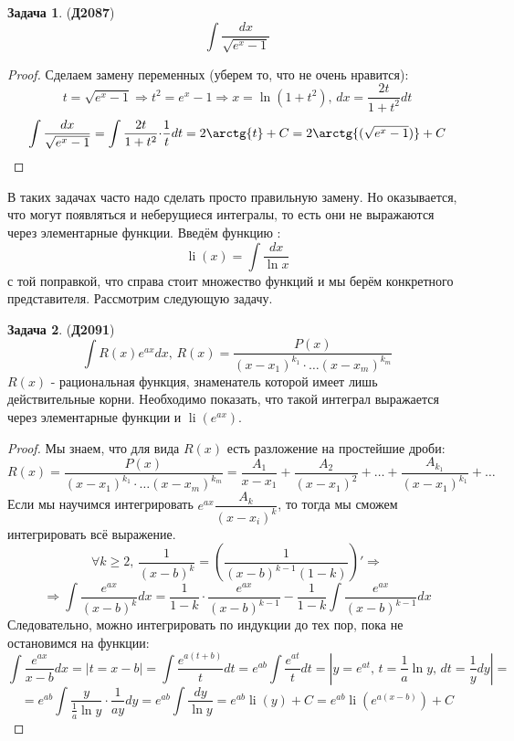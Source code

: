 \documentclass[12pt]{article}
\theoremstyle{definition}
\newtheorem{problem}{Задача}
\DeclareMathOperator{\dint}{\displaystyle\int}
\DeclareMathOperator{\li}{\operatorname{li}}
\begin{document}
\begin{problem}(\textbf{Д2087})
	$$
		\dint\dfrac{dx}{\sqrt{e^x - 1}}
	$$
\end{problem}
\begin{proof}
	Сделаем замену переменных (уберем то, что не очень нравится):
	$$
		t = \sqrt{e^x - 1} \Rightarrow t^2 = e^x - 1 \Rightarrow x = \ln{(1 +t^2)}, \, dx = \dfrac{2t}{1 + t^2}dt
	$$
	$$
		\dint\dfrac{dx}{\sqrt{e^x - 1}} = \dint \dfrac{2t}{1+t^2}{\cdot}\dfrac{1}{t}dt = 2 \arctg{t} + C = 2 \arctg{(\sqrt{e^x - 1})} +C
	$$
\end{proof}
В таких задачах часто надо сделать просто правильную замену. Но оказывается, что могут появляться и неберущиеся интегралы, то есть они не выражаются через элементарные функции. Введём функцию :
$$
	\li(x) = \dint \dfrac{dx}{\ln{x}}
$$
с той поправкой, что справа стоит множество функций и мы берём конкретного представителя. Рассмотрим следующую задачу.
\begin{problem}(\textbf{Д2091})
	$$
		\dint R(x) e^{ax} dx, \, R(x) = \dfrac{P(x)}{(x - x_1)^{k_1}{\cdot}\dotsc(x - x_m)^{k_m}}
	$$
	$R(x)$ - рациональная функция, знаменатель которой имеет лишь действительные корни. Необходимо показать, что такой интеграл выражается через элементарные функции и $\li(e^{ax})$.
\end{problem}
\begin{proof}
	Мы знаем, что для вида $R(x)$ есть разложение на простейшие дроби:
	$$
		R(x) = \dfrac{P(x)}{(x - x_1)^{k_1}{\cdot}\dotsc(x - x_m)^{k_m}} = \dfrac{A_1}{x - x_1} + \dfrac{A_2}{(x-x_1)^2} + \dotsc + \dfrac{A_{k_1}}{(x - x_1)^{k_1}} + \dotsc
	$$
	Если мы научимся интегрировать $e^{ax}\dfrac{A_k}{(x - x_i)^k}$, то тогда мы сможем интегрировать всё выражение. 
	$$
		\forall k \geq 2, \, \dfrac{1}{(x-b)^k} = \left(\dfrac{1}{(x - b)^{k-1}(1 -k)}\right)' \Rightarrow
	$$
	$$
		\Rightarrow \dint \dfrac{e^{ax}}{(x - b)^k}dx = \dfrac{1}{1 -k}{\cdot}\dfrac{e^{ax}}{(x - b)^{k-1}} - \dfrac{1}{1 -k} \dint \dfrac{e^{ax}}{(x - b)^{k-1}}dx
	$$
	Следовательно, можно интегрировать по индукции до тех пор, пока не остановимся на функции:
	$$
		\dint \dfrac{e^{ax}}{x - b}dx = |t = x - b| = \dint\dfrac{e^{a(t + b)}}{t}dt = e^{ab}\dint\dfrac{e^{at}}{t}dt = \left|y = e^{at}, \, t = \dfrac{1}{a}\ln{y}, \, dt = \dfrac{1}{y}dy \right| = 
	$$
	$$
		=e^{ab}\dint \dfrac{y}{\tfrac{1}{a}\ln{y}}{\cdot}\dfrac{1}{ay}dy = e^{ab}\dint \dfrac{dy}{\ln{y}} = e^{ab}\li(y) + C = e^{ab}\li\left(e^{a(x - b)}\right) + C
	$$
\end{proof}
\end{document}
